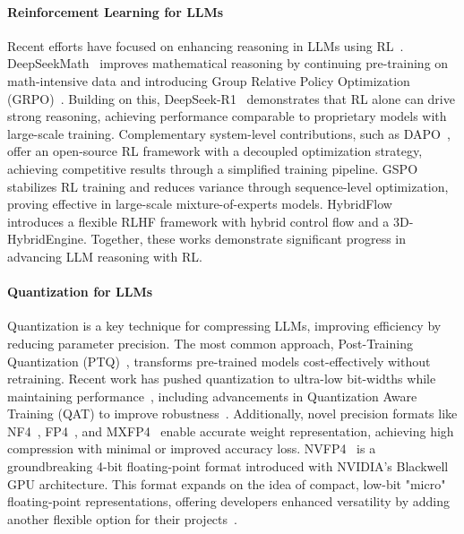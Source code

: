 \paragraph{Reinforcement Learning for LLMs}

Recent efforts have focused on enhancing reasoning in LLMs using RL~\citep{slow-thinking,sft-rl-study}. DeepSeekMath~\citep{grpo} improves mathematical reasoning by continuing pre-training on math-intensive data and introducing Group Relative Policy Optimization (GRPO)~\citep{grpo}. Building on this, DeepSeek-R1~\citep{deepseek-r1} demonstrates that RL alone can drive strong reasoning, achieving performance comparable to proprietary models with large-scale training. Complementary system-level contributions, such as DAPO~\citep{dapo}, offer an open-source RL framework with a decoupled optimization strategy, achieving competitive results through a simplified training pipeline. GSPO~\citep{gspo} stabilizes RL training and reduces variance through sequence-level optimization, proving effective in large-scale mixture-of-experts models. HybridFlow~\citep{hybridflow} introduces a flexible RLHF framework with hybrid control flow and a 3D-HybridEngine. Together, these works demonstrate significant progress in advancing LLM reasoning with RL.


\paragraph{Quantization for LLMs}
Quantization is a key technique for compressing LLMs, improving efficiency by reducing parameter precision. The most common approach, Post-Training Quantization (PTQ)~\citep{dettmers2022gpt3,frantar2022gptq,xiao2023smoothquant,shao2023omniquant,lin2024awq}, transforms pre-trained models cost-effectively without retraining. Recent work has pushed quantization to ultra-low bit-widths while maintaining performance~\citep{huang2024slim,dettmers2023spqr,shang2023pb,huang2024billm,liao2024apiq,tseng2024quip,huang2024mixture}, including advancements in Quantization Aware Training (QAT) to improve robustness~\citep{liu2023llm,chen2024efficientqat}. Additionally, novel precision formats like NF4~\citep{qlora}, FP4~\citep{tseng2025training,chmiel2025fp4}, and MXFP4~\citep{chmiel2025fp4} enable accurate weight representation, achieving high compression with minimal or improved accuracy loss. NVFP4~\citep{nvidia2024blackwell} is a groundbreaking 4-bit floating-point format introduced with NVIDIA's Blackwell GPU architecture. This format expands on the idea of compact, low-bit "micro" floating-point representations, offering developers enhanced versatility by adding another flexible option for their projects~\citep{zhang2025sageattention3,castro2025quartet,lee2024amxfp4}.


